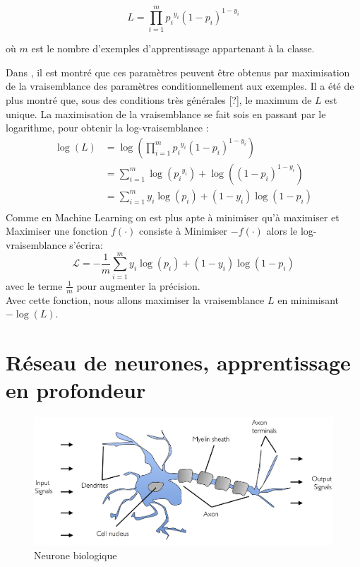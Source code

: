 	\begin{equation}\label{eq:likelyhood}
		L = \prod_{i=1}^{m} {p_i}^{y_i} (1-p_i)^{1-y_i}
	\end{equation}
	
	où $m$ est le nombre d'exemples d'apprentissage appartenant à la classe.
	
	Dans \cite{antoine2018apprentissage}, il est montré que ces paramètres peuvent être obtenus par maximisation de la vraisemblance des paramètres conditionnellement aux exemples. Il a été de plus montré que, sous des conditions très générales [?], le maximum de $L$ est unique.
	La maximisation de la vraisemblance se fait sois en passant par le logarithme, pour obtenir la log-vraisemblance :
	\begin{equation}
		\begin{split}
			\log(L)  & = \log(\prod_{i=1}^{m} {p_i}^{y_i} (1-p_i)^{1-y_i}) \\
			& =\sum_{i=1}^{m} \log( {p_i}^{y_i}) +\log((1-p_i)^{1-y_i})\\
			& =\sum_{i=1}^{m} {y_i}\log( {p_i}) +{(1-y_i)}\log(1-p_i)\\
		\end{split}
	\end{equation}
	Comme en Machine Learning on est plus apte à minimiser qu'à maximiser et Maximiser une fonction $f(\cdot)$ consiste à Minimiser $-f(\cdot)$ alors le log-vraisemblance s'écrira: 
	\begin{equation}\label{eq:log-likelyhood}
		\mathcal{L} = -\frac{1}{m}\sum_{i=1}^{m} {y_i}\log( {p_i}) +{(1-y_i)}\log(1-p_i)
	\end{equation}
	avec le terme $\frac{1}{m}$ pour augmenter la précision.\\
	Avec cette fonction, nous allons maximiser la vraisemblance $L$ en minimisant $-\log(L)$.	
		
	
	
\section{Réseau de neurones, apprentissage en profondeur}
	\begin{figure}[hth]%
		\centering
		\includegraphics[width=\textwidth]{images/neuron.png}
		\caption{Neurone biologique \cite{ml2008python}
		}
		\label{fig:bio_neuron}
	\end{figure}


